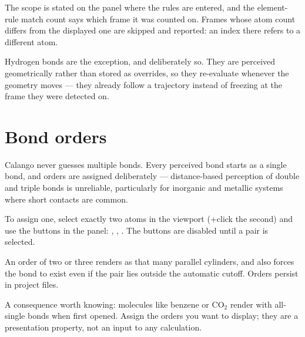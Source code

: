 The scope is stated on the panel where the rules are entered, and the
element-rule match count says which frame it was counted on. Frames whose
atom count differs from the displayed one are skipped and reported: an
index there refers to a different atom.

\begin{calnote}
Hydrogen bonds are the exception, and deliberately so. They are perceived
geometrically rather than stored as overrides, so they re-evaluate
whenever the geometry moves --- they already follow a trajectory instead
of freezing at the frame they were detected on.
\end{calnote}

\section{Bond orders}
\label{sec:bond-orders}

Calango never guesses multiple bonds. Every perceived bond starts as a
single bond, and orders are assigned deliberately --- distance-based
perception of double and triple bonds is unreliable, particularly for
inorganic and metallic systems where short contacts are common.

To assign one, select exactly two atoms in the viewport
(+click the second) and use the  buttons in the
 panel: , , . The
buttons are disabled until a pair is selected.

An order of two or three renders as that many parallel cylinders, and also
forces the bond to exist even if the pair lies outside the automatic
cutoff. Orders persist in project files.

\begin{calnote}
A consequence worth knowing: molecules like benzene or CO$_2$ render with
all-single bonds when first opened. Assign the orders you want to display;
they are a presentation property, not an input to any calculation.
\end{calnote}

